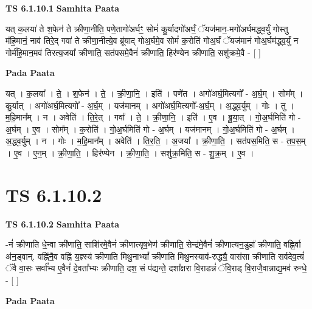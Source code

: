 \documentclass[17pt]{extarticle}
\begin{document}
\textbf{TS 6.1.10.1 } \newline
\textbf{Samhita Paata} \newline

यत् क॒लया॑ ते श॒फेन॑ ते क्रीणा॒नीति॒ पणे॒तागो॑अर्घꣳ॒॒ सोमं॑ कु॒र्यादगो॑अर्घं॒ ॅयज॑मान॒-मगो॑अर्घमद्ध्व॒र्युं गोस्तु म॑हि॒मानं॒ नाव॑ तिरे॒द् गवा॑ ते क्रीणा॒नीत्ये॒व ब्रू॑याद् गोअ॒र्घमे॒व सोमं॑ क॒रोति॑ गोअ॒र्घं ॅयज॑मानं गोअ॒र्घम॑द्ध्व॒र्युं न गोर्म॑हि॒मान॒मव॑ तिरत्य॒जया᳚ क्रीणाति॒ सत॑पसमे॒वैनं॑ क्रीणाति॒ हिर॑ण्येन क्रीणाति॒ सशु॑क्रमे॒वै - [  ] \newline

\textbf{Pada Paata} \newline

यत् । क॒लया᳚ । ते॒ । श॒फेन॑ । ते॒ । क्री॒णा॒नि॒ । इति॑ । पणे॑त । अगो॑अर्घ॒मित्यगो᳚ - अ॒र्घ॒म् । सोम᳚म् । कु॒र्यात् । अगो॑अर्घ॒मित्यगो᳚ - अ॒र्घ॒म् । यज॑मानम् । अगो॑अर्घ॒मित्यगो᳚-अ॒र्घ॒म् । अ॒द्ध्व॒र्युम् । गोः । तु । म॒हि॒मान᳚म् । न । अवेति॑ । ति॒रे॒त् । गवा᳚ । ते॒ । क्री॒णा॒नि॒ । इति॑ । ए॒व । ब्रू॒या॒त् । गो॒अ॒र्घमिति॑ गो - अ॒र्घम् । ए॒व । सोम᳚म् । क॒रोति॑ । गो॒अ॒र्घमिति॑ गो - अ॒र्घम् । यज॑मानम् । गो॒अ॒र्घमिति॑ गो - अ॒र्घम् । अ॒द्ध्व॒र्युम् । न । गोः । म॒हि॒मान᳚म् । अवेति॑ । ति॒र॒ति॒ । अ॒जया᳚ । क्री॒णा॒ति॒ । सत॑पस॒मिति॒ स - त॒प॒स॒म् । ए॒व । ए॒न॒म् । क्री॒णा॒ति॒ । हिर॑ण्येन । क्री॒णा॒ति॒ । सशु॑क्र॒मिति॒ स - शु॒क्र॒म् । ए॒व ।  \newline




\section*{ TS 6.1.10.2 }

\textbf{TS 6.1.10.2 } \newline
\textbf{Samhita Paata} \newline

-नं॑ क्रीणाति धे॒न्वा क्री॑णाति॒ साशि॑रमे॒वैनं॑ क्रीणात्यृष॒भेण॑ क्रीणाति॒ सेन्द्र॑मे॒वैनं॑ क्रीणात्यन॒डुहा᳚ क्रीणाति॒ वह्नि॒र्वा अ॑न॒ड्वान्. वह्नि॑नै॒व वह्नि॑ य॒ज्ञ्स्य॑ क्रीणाति मिथु॒नाभ्यां᳚ क्रीणाति मिथु॒नस्याव॑-रुद्ध्यै॒ वास॑सा क्रीणाति सर्वदेव॒त्यं॑ ॅवै वा॒सः सर्वा᳚भ्य ए॒वैनं॑ दे॒वता᳚भ्यः क्रीणाति॒ दश॒ सं प॑द्यन्ते॒ दशा᳚क्षरा वि॒राडन्नं॑ ॅवि॒राड् वि॒राजै॒वान्नाद्य॒मव॑ रुन्धे॒ - [  ] \newline

\textbf{Pada Paata} \newline
\end{document}
